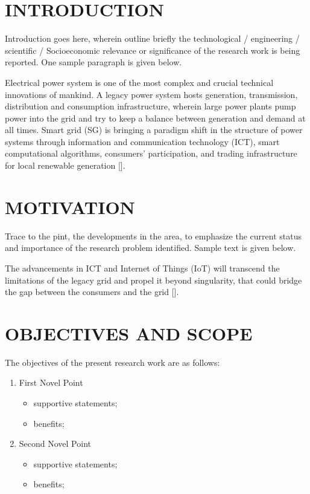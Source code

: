 \documentclass[12pt,a4paper, twoside]{report}
\begin{document}
\thispagestyle{empty}

\newpage
{}
\section{INTRODUCTION}
Introduction goes here, wherein outline briefly the technological / engineering / scientific / Socioeconomic relevance or significance of the research work is being reported. One sample paragraph is given below.

Electrical power system is one of the most complex and crucial technical innovations of mankind. A legacy power system hosts generation, transmission, distribution and consumption infrastructure, wherein large power plants pump power into the grid and try to keep a balance between generation and demand at all times. Smart grid (SG) is bringing a paradigm shift in the structure of power systems through information and communication technology (ICT), smart computational algorithms, consumers' participation, and trading infrastructure for local renewable generation [\cite{fang2012}]. 

\section{MOTIVATION}
Trace to the pint, the developments in the area, to emphasize the current status and importance of the research problem identified. Sample text is given below.

The advancements in ICT and Internet of Things (IoT) will transcend the limitations of the legacy grid and propel it beyond singularity, that could bridge the gap between the consumers and the grid [\cite{collier2017}]. 

\section{OBJECTIVES AND SCOPE}

\noindent The objectives of the present research work are as follows:

\begin{enumerate}[itemsep=0.2cm,topsep=1pt,parsep=0pt,partopsep=0pt]
\item First Novel Point
\begin{itemize}[itemsep=0cm,topsep=2pt]
\item supportive statements;
\item benefits;
\end{itemize}
\item Second Novel Point
\begin{itemize}[itemsep=0cm,topsep=2pt]
\item supportive statements;
\item benefits;
\end{itemize}

\end{enumerate}
\end{document}

